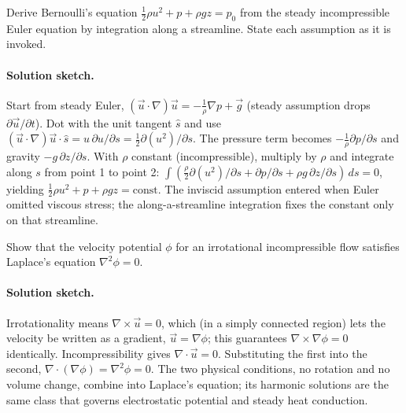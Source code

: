 \begin{exercise}
Derive Bernoulli's equation $\tfrac{1}{2}\rho u^2 + p + \rho g z =
p_0$ from the steady incompressible Euler equation by integration
along a streamline. State each assumption as it is invoked.

\paragraph{Solution sketch.} Start from steady Euler, $(\vec{u}\cdot
\nabla)\vec{u} = -\tfrac1\rho\nabla p + \vec{g}$ (steady assumption
drops $\partial\vec{u}/\partial t$). Dot with the unit tangent
$\hat{s}$ and use $(\vec{u}\cdot\nabla)\vec{u}\cdot\hat{s} =
u\,\partial u/\partial s = \tfrac12\partial(u^2)/\partial s$. The
pressure term becomes $-\tfrac1\rho\partial p/\partial s$ and gravity
$-g\,\partial z/\partial s$. With $\rho$ constant (incompressible),
multiply by $\rho$ and integrate along $s$ from point 1 to point 2:
$\int(\tfrac\rho2\partial(u^2)/\partial s + \partial p/\partial s +
\rho g\,\partial z/\partial s)\,ds = 0$, yielding $\tfrac12\rho u^2 +
p + \rho g z = \text{const}$. The inviscid assumption entered when
Euler omitted viscous stress; the along-a-streamline integration
fixes the constant only on that streamline.
\end{exercise}

\begin{exercise}
Show that the velocity potential $\phi$ for an irrotational
incompressible flow satisfies Laplace's equation $\nabla^2 \phi =
0$.

\paragraph{Solution sketch.} Irrotationality means $\nabla\times
\vec{u} = 0$, which (in a simply connected region) lets the velocity
be written as a gradient, $\vec{u} = \nabla\phi$; this guarantees
$\nabla\times\nabla\phi = 0$ identically. Incompressibility gives
$\nabla\cdot\vec{u} = 0$. Substituting the first into the second,
$\nabla\cdot(\nabla\phi) = \nabla^2\phi = 0$. The two physical
conditions, no rotation and no volume change, combine into Laplace's
equation; its harmonic solutions are the same class that governs
electrostatic potential and steady heat conduction.
\end{exercise}

